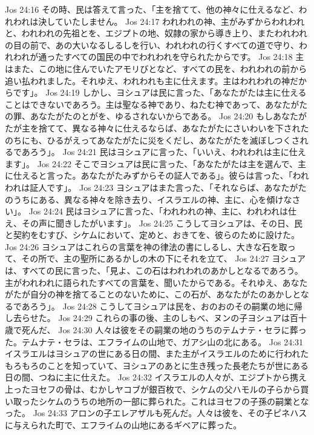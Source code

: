 Jos 24:16  その時、民は答えて言った、「主を捨てて、他の神々に仕えるなど、われわれは決していたしません。
Jos 24:17  われわれの神、主がみずからわれわれと、われわれの先祖とを、エジプトの地、奴隷の家から導き上り、またわれわれの目の前で、あの大いなるしるしを行い、われわれの行くすべての道で守り、われわれが通ったすべての国民の中でわれわれを守られたからです。
Jos 24:18  主はまた、この地に住んでいたアモリびとなど、すべての民を、われわれの前から追い払われました。それゆえ、われわれも主に仕えます。主はわれわれの神だからです」。
Jos 24:19  しかし、ヨシュアは民に言った、「あなたがたは主に仕えることはできないであろう。主は聖なる神であり、ねたむ神であって、あなたがたの罪、あなたがたのとがを、ゆるされないからである。
Jos 24:20  もしあなたがたが主を捨てて、異なる神々に仕えるならば、あなたがたにさいわいを下されたのちにも、ひるがえってあなたがたに災をくだし、あなたがたを滅ぼしつくされるであろう」。
Jos 24:21  民はヨシュアに言った、「いいえ、われわれは主に仕えます」。
Jos 24:22  そこでヨシュアは民に言った、「あなたがたは主を選んで、主に仕えると言った。あなたがたみずからその証人である」。彼らは言った、「われわれは証人です」。
Jos 24:23  ヨシュアはまた言った、「それならば、あなたがたのうちにある、異なる神々を除き去り、イスラエルの神、主に、心を傾けなさい」。
Jos 24:24  民はヨシュアに言った、「われわれの神、主に、われわれは仕え、その声に聞きしたがいます」。
Jos 24:25  こうしてヨシュアは、その日、民と契約をむすび、シケムにおいて、定めと、おきてを、彼らのために設けた。
Jos 24:26  ヨシュアはこれらの言葉を神の律法の書にしるし、大きな石を取って、その所で、主の聖所にあるかしの木の下にそれを立て、
Jos 24:27  ヨシュアは、すべての民に言った、「見よ、この石はわれわれのあかしとなるであろう。主がわれわれに語られたすべての言葉を、聞いたからである。それゆえ、あなたがたが自分の神を捨てることのないために、この石が、あなたがたのあかしとなるであろう」。
Jos 24:28  こうしてヨシュアは民を、おのおのその嗣業の地に帰し去らせた。
Jos 24:29  これらの事の後、主のしもべ、ヌンの子ヨシュアは百十歳で死んだ、
Jos 24:30  人々は彼をその嗣業の地のうちのテムナテ・セラに葬った。テムナテ・セラは、エフライムの山地で、ガアシ山の北にある。
Jos 24:31  イスラエルはヨシュアの世にある日の間、また主がイスラエルのために行われたもろもろのことを知っていて、ヨシュアのあとに生き残った長老たちが世にある日の間、つねに主に仕えた。
Jos 24:32  イスラエルの人々が、エジプトから携え上ったヨセフの骨は、むかしヤコブが銀百枚で、シケムの父ハモルの子らから買い取ったシケムのうちの地所の一部に葬られた。これはヨセフの子孫の嗣業となった。
Jos 24:33  アロンの子エレアザルも死んだ。人々は彼を、その子ピネハスに与えられた町で、エフライムの山地にあるギベアに葬った。



